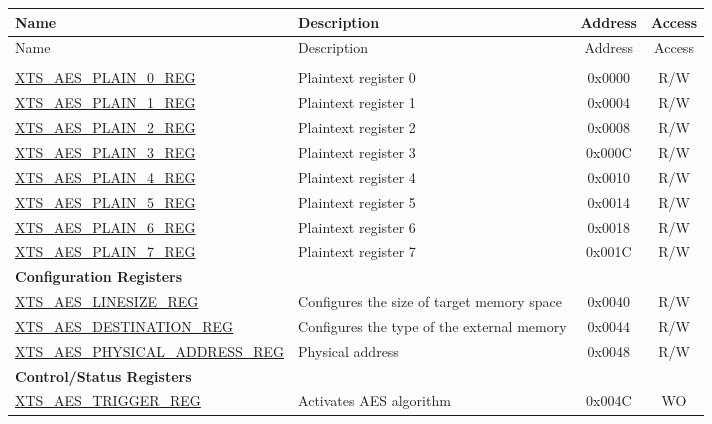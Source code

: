 

\begin{longtable}{ | p{6.0cm} | p{6.6cm} | c | c| }
\hline\rowcolor{lightgray}
Name & Description & Address & Access \\ \hline
\endfirsthead
\hline
\rowcolor{lightgray}
Name & Description & Address & Access  \\
\hline
\endhead
\endfoot
        
\multicolumn{4}{|l|}{\textbf{Plaintext Register Heap}} \\\hline
\hyperref[regdesc:XTSAESPLAINNREG]{XTS\_AES\_PLAIN\_0\_REG}  & Plaintext register  0   & 0x0000 & R/W \\\hline
\hyperref[regdesc:XTSAESPLAINNREG]{XTS\_AES\_PLAIN\_1\_REG}  & Plaintext register  1   & 0x0004 & R/W \\\hline
\hyperref[regdesc:XTSAESPLAINNREG]{XTS\_AES\_PLAIN\_2\_REG}  & Plaintext register  2   & 0x0008 & R/W \\\hline
\hyperref[regdesc:XTSAESPLAINNREG]{XTS\_AES\_PLAIN\_3\_REG}  & Plaintext register  3   & 0x000C & R/W \\\hline
\hyperref[regdesc:XTSAESPLAINNREG]{XTS\_AES\_PLAIN\_4\_REG}  & Plaintext register  4   & 0x0010 & R/W \\\hline
\hyperref[regdesc:XTSAESPLAINNREG]{XTS\_AES\_PLAIN\_5\_REG}  & Plaintext register  5   & 0x0014 & R/W \\\hline
\hyperref[regdesc:XTSAESPLAINNREG]{XTS\_AES\_PLAIN\_6\_REG}  & Plaintext register  6   & 0x0018 & R/W \\\hline
\hyperref[regdesc:XTSAESPLAINNREG]{XTS\_AES\_PLAIN\_7\_REG}  & Plaintext register  7   & 0x001C & R/W \\\hline
\multicolumn{4}{|l|}{\textbf{Configuration Registers}} \\ \hline
\hyperref[regdesc:XTSAESLINESIZEREG]       {XTS\_AES\_LINESIZE\_REG         }  & Configures the size of target memory space & 0x0040 & R/W \\\hline
\hyperref[regdesc:XTSAESDESTINATIONREG]    {XTS\_AES\_DESTINATION\_REG      }  & Configures the type of the external memory   & 0x0044 & R/W \\\hline
\hyperref[regdesc:XTSAESPHYSICALADDRESSREG]{XTS\_AES\_PHYSICAL\_ADDRESS\_REG}  & Physical address   & 0x0048 & R/W \\\hline
\multicolumn{4}{|l|}{\textbf{Control/Status Registers}} \\ \hline
\hyperref[regdesc:XTSAESTRIGGERREG]        {XTS\_AES\_TRIGGER\_REG          }  & Activates AES algorithm         & 0x004C & WO \\\hline

\end{longtable}
